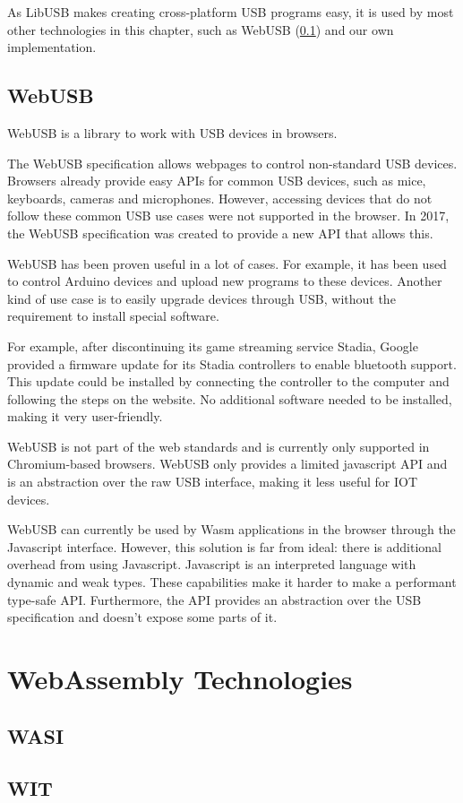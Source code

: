 As LibUSB makes creating cross-platform USB programs easy, it is used by most other technologies in this chapter, such as WebUSB (\ref{section:WebUSB}) and our own implementation.

\subsection{WebUSB}
\label{section:WebUSB}

WebUSB \cite{WebUSB} is a library to work with USB devices in browsers.

The WebUSB specification allows webpages to control non-standard USB devices. Browsers already provide easy APIs for common USB devices, such as mice, keyboards, cameras and microphones. However, accessing devices that do not follow these common USB use cases were not supported in the browser. In 2017, the WebUSB specification was created to provide a new API that allows this.

WebUSB has been proven useful in a lot of cases. For example, it has been used to control Arduino devices and upload new programs to these devices. Another kind of use case is to easily upgrade devices through USB, without the requirement to install special software. 

For example, after discontinuing its game streaming service Stadia, Google provided a firmware update for its Stadia controllers to enable bluetooth support. This update could be installed by connecting the controller to the computer and following the steps on the website. No additional software needed to be installed, making it very user-friendly.

WebUSB is not part of the web standards and is currently only supported in Chromium-based browsers. WebUSB only provides a limited javascript API and is an abstraction over the raw USB interface, making it less useful for IOT devices.

WebUSB can currently be used by Wasm applications in the browser through the Javascript interface. However, this solution is far from ideal: there is additional overhead from using Javascript. Javascript is an interpreted language with dynamic and weak types. These capabilities make it harder to make a performant type-safe API. Furthermore, the API provides an abstraction over the USB specification and doesn't expose some parts of it.

\section{WebAssembly Technologies}

\subsection{WASI}

\subsection{WIT}